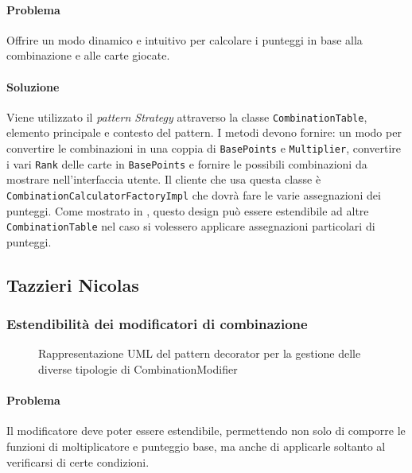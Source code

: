 \documentclass[a4paper,12pt]{report}
\begin{document}
\paragraph{Problema}
Offrire un modo dinamico e intuitivo per calcolare i punteggi in base alla combinazione e alle carte giocate.
\paragraph{Soluzione}
Viene utilizzato il \textit{pattern Strategy} attraverso la classe \texttt{CombinationTable}, elemento principale e contesto del pattern.
I metodi devono fornire: un modo per convertire le combinazioni in una coppia di \texttt{BasePoints} e \texttt{Multiplier},
 convertire i vari \texttt{Rank} delle carte in \texttt{BasePoints} e fornire le possibili
combinazioni da mostrare nell’interfaccia utente. Il cliente che usa questa classe è \texttt{CombinationCalculatorFactoryImpl}
che dovrà fare le varie assegnazioni dei punteggi. Come mostrato in , questo design può essere estendibile
ad altre \texttt{CombinationTable} nel caso si volessero applicare assegnazioni particolari di punteggi.

\subsection{Tazzieri Nicolas}
\subsubsection*{Estendibilità dei modificatori di combinazione}
\begin{figure}[H]
	\centering{}
	
	\caption{Rappresentazione UML del pattern decorator per la gestione delle diverse tipologie di CombinationModifier}
	\label{img:CombinationModfier}
\end{figure}
\paragraph{Problema}
Il modificatore deve poter essere estendibile, permettendo non solo di comporre le funzioni di  moltiplicatore e punteggio base, ma anche di applicarle soltanto al verificarsi di certe condizioni.
\end{document}
